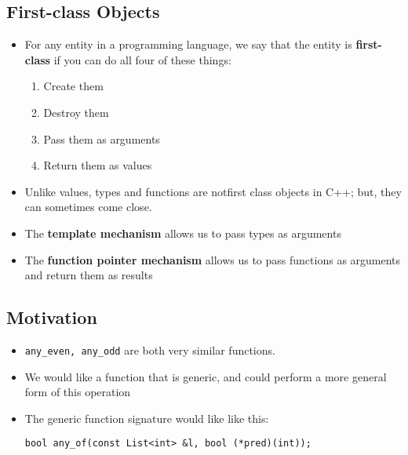 \subsection{First-class Objects}
\begin{itemize}
	\item For any entity in a programming language, we say that the entity is \textbf{first-class} if you can do all four of these things:
	\begin{enumerate}
		\item Create them
		\item Destroy them
		\item Pass them as arguments
		\item Return them as values
	\end{enumerate}
	\item Unlike values, types and functions are notfirst class objects in C++; but, they can sometimes come close.
	\item The \textbf{template mechanism} allows us to pass types as arguments
	\item The \textbf{function pointer mechanism} allows us to pass functions as arguments and return them as results
\end{itemize}

\subsection{Motivation}
\begin{itemize}
	\item \lstinline[style=C++]{any_even, any_odd} are both very similar functions.
	\item We would like a function that is generic, and could perform a more general form of this operation
	\item The generic function signature would like like this:
\begin{lstlisting}[style=C++]
bool any_of(const List<int> &l, bool (*pred)(int));
\end{lstlisting}
\end{itemize}

